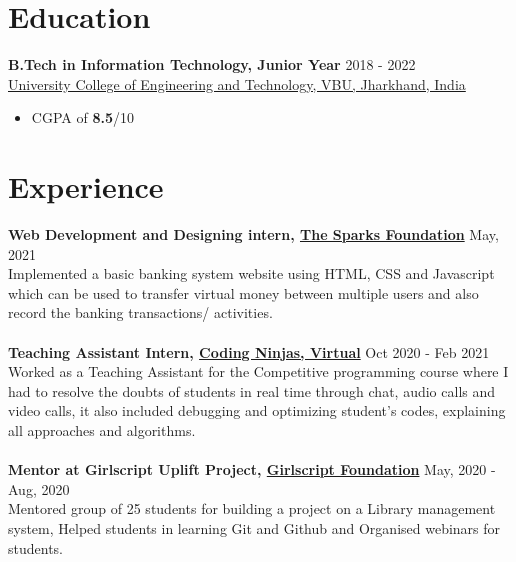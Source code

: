 \documentclass[margin, centered]{res}
\begin{document}
\begin{resume}

\section{Education}
\textbf{B.Tech in Information Technology, Junior Year} \hfill 2018 - 2022 \\
\href{http://ucetvbu.ac.in/}{University College of Engineering and Technology, VBU, Jharkhand, India}
\begin{itemize}
 \item CGPA of \textbf{8.5}/10
\end{itemize}

\section{Experience}
\textbf{Web Development and Designing intern, \href{https://www.thesparksfoundationsingapore.org/}{The Sparks Foundation}} \hfill May, 2021\\
Implemented a basic banking system website using HTML, CSS and Javascript which can be used to transfer virtual money between multiple users and also record the banking transactions/ activities.\\
\\
\textbf{Teaching Assistant Intern, \href{https://www.codingninjas.com/}{Coding Ninjas, Virtual}} \hfill Oct 2020 - Feb 2021 \\
Worked as a Teaching Assistant for the Competitive programming course where I had to resolve the doubts of students in real time through chat, audio calls and video calls, it also included debugging and optimizing student's codes, explaining all approaches and algorithms.\\
\\
\textbf{Mentor at Girlscript Uplift Project, \href{https://www.girlscript.tech/home}{Girlscript Foundation}} \hfill May, 2020 - Aug, 2020 \\
Mentored group of 25 students for building a project on a Library management system, Helped students in learning Git and Github and Organised webinars for students.

\end{resume}
\end{document}
